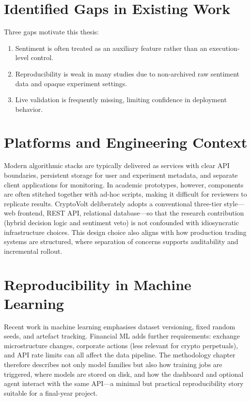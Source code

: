 \section{Identified Gaps in Existing Work}
Three gaps motivate this thesis:
\begin{enumerate}
	\item Sentiment is often treated as an auxiliary feature rather than an execution-level control.
	\item Reproducibility is weak in many studies due to non-archived raw sentiment data and opaque experiment settings.
	\item Live validation is frequently missing, limiting confidence in deployment behavior.
\end{enumerate}

\section{Platforms and Engineering Context}
Modern algorithmic stacks are typically delivered as services with clear API boundaries, persistent storage for user and experiment metadata, and separate client applications for monitoring. In academic prototypes, however, components are often stitched together with ad-hoc scripts, making it difficult for reviewers to replicate results. CryptoVolt deliberately adopts a conventional three-tier style---web frontend, REST API, relational database---so that the research contribution (hybrid decision logic and sentiment veto) is not confounded with idiosyncratic infrastructure choices. This design choice also aligns with how production trading systems are structured, where separation of concerns supports auditability and incremental rollout.

\section{Reproducibility in Machine Learning}
Recent work in machine learning emphasises dataset versioning, fixed random seeds, and artefact tracking. Financial ML adds further requirements: exchange microstructure changes, corporate actions (less relevant for crypto perpetuals), and API rate limits can all affect the data pipeline. The methodology chapter therefore describes not only model families but also how training jobs are triggered, where models are stored on disk, and how the dashboard and optional agent interact with the same API---a minimal but practical reproducibility story suitable for a final-year project.

